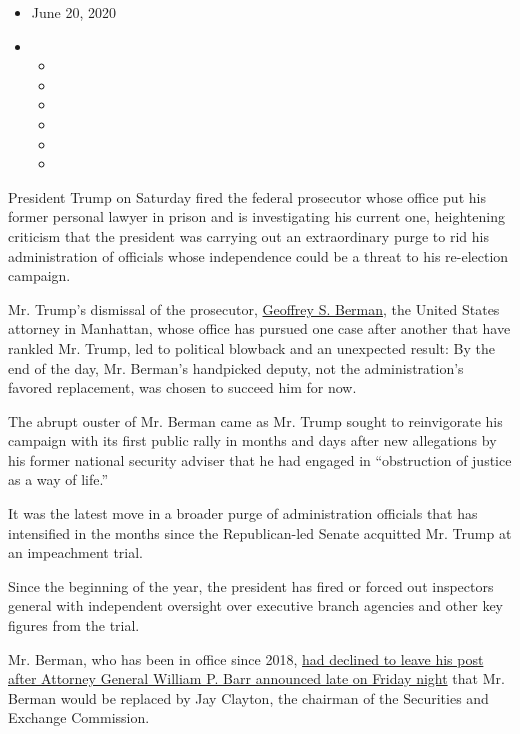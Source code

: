 \begin{itemize}
\item
  June 20, 2020
\item
  \begin{itemize}
  \item
  \item
  \item
  \item
  \item
  \item
  \end{itemize}
\end{itemize}

President Trump on Saturday fired the federal prosecutor whose office
put his former personal lawyer in prison and is investigating his
current one, heightening criticism that the president was carrying out
an extraordinary purge to rid his administration of officials whose
independence could be a threat to his re-election campaign.

Mr. Trump's dismissal of the prosecutor,
\href{https://www.nytimes.com/2020/07/09/us/politics/top-manhattan-prosecutor-ousted-by-trump-details-firing.html}{Geoffrey
S. Berman}, the United States attorney in Manhattan, whose office has
pursued one case after another that have rankled Mr. Trump, led to
political blowback and an unexpected result: By the end of the day, Mr.
Berman's handpicked deputy, not the administration's favored
replacement, was chosen to succeed him for now.

The abrupt ouster of Mr. Berman came as Mr. Trump sought to reinvigorate
his campaign with its first public rally in months and days after new
allegations by his former national security adviser that he had engaged
in ``obstruction of justice as a way of life.''

It was the latest move in a broader purge of administration officials
that has intensified in the months since the Republican-led Senate
acquitted Mr. Trump at an impeachment trial.

Since the beginning of the year, the president has fired or forced out
inspectors general with independent oversight over executive branch
agencies and other key figures from the trial.

Mr. Berman, who has been in office since 2018,
\href{https://www.nytimes.com/2020/06/19/nyregion/us-attorney-manhattan-trump.html}{had
declined to leave his post after Attorney General William P. Barr
announced late on Friday night} that Mr. Berman would be replaced by Jay
Clayton, the chairman of the Securities and Exchange Commission.

